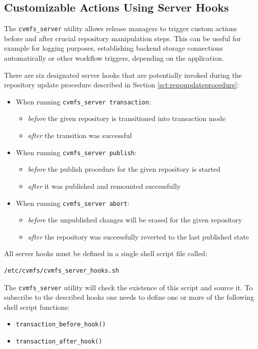 \subsection{Customizable Actions Using Server Hooks}
\label{sct:serverhooks}
The \texttt{cvmfs\_server} utility allows release managers to trigger custom actions before and after crucial repository manipulation steps. This can be useful for example for logging purposes, establishing backend storage connections automatically or other workflow triggers, depending on the application.

There are six designated server hooks that are potentially invoked during the repository update procedure described in Section \ref{sct:repoupdateprocedure}:
\begin{itemize}
	\item When running \texttt{cvmfs\_server transaction}:
	\begin{itemize}
		\item \emph{before} the given repository is transitioned into transaction mode
		\item \emph{after} the transition was successful
	\end{itemize}
	\item When running \texttt{cvmfs\_server publish}:
	\begin{itemize}
		\item \emph{before} the publish procedure for the given repository is started
		\item \emph{after} it was published and remounted successfully
	\end{itemize}
	\item When running \texttt{cvmfs\_server abort}:
	\begin{itemize}
		\item \emph{before} the unpublished changes will be erased for the given repository
		\item \emph{after} the repository was successfully reverted to the last published state
	\end{itemize}
\end{itemize}
All server hooks must be defined in a single shell script file called:
\begin{verbatim}
/etc/cvmfs/cvmfs_server_hooks.sh
\end{verbatim}
The \texttt{cvmfs\_server} utility will check the existence of this script and source it.
To subscribe to the described hooks one needs to define one or more of the following shell script functions:
\begin{itemize}
	\setlength{\itemsep}{1pt}
	\item \texttt{transaction\_before\_hook()}
	\item \texttt{transaction\_after\_hook()}
\end{itemize}
